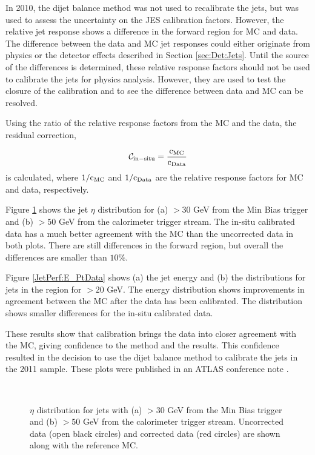 In 2010, the dijet \pt{} balance method was not used to recalibrate the jets, but was used to assess the uncertainty on the JES calibration factors.
However, the relative jet response \cite{ref:EtaInter2010} shows a difference in the forward region for MC and data.
The difference between the data and MC jet responses could either originate from physics or the detector effects described in Section \ref{sec:Det:Jets}. 
Until the source of the differences is determined, these relative response factors should not be used to calibrate the jets for physics analysis.
However, they are used to test the closure of the calibration and to see the difference between data and MC can be resolved.

Using the ratio of the relative response factors from the MC and the data, the residual correction, 

\begin{equation}
\mathcal{C_{\rm{in-situ}}} = \frac{\rm{c_{MC}}}{\rm{c_{Data}}}
\label{JetPerf:ResidualCorrection}
\end{equation}
is calculated, where ${1}/{\rm{c_{MC}}}$ and ${1}/{\rm{c_{Data}}}$ are the relative response factors for MC and data, respectively. 


Figure \ref{JetPerf:EtaData} shows the jet $\eta$ distribution for (a) \pt{} $>30$ GeV from the Min Bias trigger and (b) \pt{}$>50$ GeV from the calorimeter trigger stream. 
The in-situ calibrated data has a much better agreement with the MC than the uncorrected data in both plots. 
There are still differences in the forward region, but overall the differences are smaller than $10\%$.

Figure \ref{JetPerf:E_PtData} shows (a) the jet energy  and  (b) the \pt{} distributions  for jets in the region   for \pt{}$>20$ GeV. 
The energy distribution shows improvements in agreement between the MC after the data has been calibrated.
The \pt{} distribution shows smaller differences for the in-situ calibrated data.

These results show that calibration brings the data into  closer agreement with the MC, giving confidence to the method and the results.
This confidence resulted in the decision to use the dijet \pt{} balance method to calibrate the jets in the 2011 sample. 
These plots were published in an ATLAS conference note \cite{ref:EtaInter2010}.


\begin{figure}
\centering
\mbox{
              \quad
              \quad
}
\caption[Effect of additional calibration on the jet $\eta$ distribution]{
$\eta$ distribution for jets with (a) \pt{} $>30$ GeV from the Min Bias trigger and (b) \pt{} $>50$ GeV from the calorimeter trigger stream. 
Uncorrected data (open black circles) and corrected data (red circles) are shown along with the reference MC. 
\label{JetPerf:EtaData}}
\end{figure}

